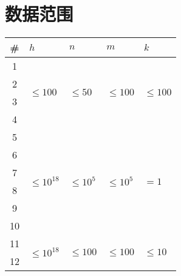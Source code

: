 \documentclass[11pt, a4paper]{article}
\begin{document}
\section*{数据范围}
\begin{center}
\begin{tabular}{|c|p{70pt}|p{70pt}|p{70pt}|p{70pt}|}
\hline
\# & $h$                             & $n$                          & $m$                            & $k$                          \\
\hline
1  & \multirow{4}{*}{$\leq 100$}     & \multirow{4}{*}{$\leq 50$}   & \multirow{4}{*}{$\leq 100$}    & \multirow{4}{*}{$\leq 100$}  \\
\cline{1-1}
2  &                                 &                              &                                &                              \\
\cline{1-1}
3  &                                 &                              &                                &                              \\
\cline{1-1}
4  &                                 &                              &                                &                              \\
\hline
5  & \multirow{6}{*}{$\leq 10^{18}$} & \multirow{6}{*}{$\leq 10^5$} & \multirow{6}{*}{$\leq 10^5$}   & \multirow{6}{*}{$= 1$}       \\
\cline{1-1}
6  &                                 &                              &                                &                              \\
\cline{1-1}
7  &                                 &                              &                                &                              \\
\cline{1-1}
8  &                                 &                              &                                &                              \\
\cline{1-1}
9  &                                 &                              &                                &                              \\
\cline{1-1}
10 &                                 &                              &                                &                              \\
\hline
11 & \multirow{7}{*}{$\leq 10^{18}$} & \multirow{7}{*}{$\leq 100$}  & \multirow{7}{*}{$\leq 100$}    & \multirow{7}{*}{$\leq 10$}   \\
\cline{1-1}
12 &                                 &                              &                                &                              \\

\end{tabular}
\end{center}
\end{document}
